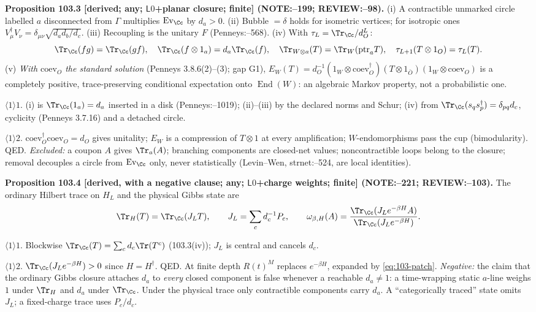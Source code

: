\textbf{Proposition 103.3 [derived; any; \(\mathsf L0\)+planar closure; finite] (NOTE:--199; REVIEW:--98).}
(i) A contractible unmarked circle labelled \(a\) disconnected from \(\Gamma\) multiplies \(\operatorname{Ev}_\Cc\) by \(d_a>0\).
(ii) Bubble \(=\delta\) holds for isometric vertices; for isotropic ones \(V^\dagger_\mu V_\nu=\delta_{\mu\nu}\sqrt{d_ad_b/d_c}\).
(iii) Recoupling is the unitary \(F\) (Penneys:--568). (iv) With \(\tau_L=\Tr_\Cc/d_O^L\):
\[
 \Tr_\Cc(fg)=\Tr_\Cc(gf),\quad \Tr_\Cc(f\otimes1_a)=d_a\Tr_\Cc(f),\quad \Tr_{W\otimes a}(T)=\Tr_W(\mathrm{ptr}_aT),\quad \tau_{L+1}(T\otimes1_O)=\tau_L(T).
\]
(v) \emph{With \(\mathrm{coev}_O\) the standard solution} (Penneys 3.8.6(2)--(3); gap G1),\newline
\(E_W(T)=d_O^{-1}(1_W\otimes\mathrm{coev}_O^\dagger)(T\otimes1_{\bar O})(1_W\otimes\mathrm{coev}_O)\) is a completely positive,
trace-preserving conditional expectation onto \(\operatorname{End}(W)\): an algebraic Markov property, not a probabilistic one.
\par\(\langle1\rangle1\). (i) is \(\Tr_\Cc(1_a)=d_a\) inserted in a disk (Penneys:--1019); (ii)--(iii) by the declared norms and
Schur; (iv) from \(\Tr_\Cc(s_qs_p^\dagger)=\delta_{pq}d_c\), cyclicity (Penneys 3.7.16) and a detached circle.
\par\(\langle1\rangle2\). \(\mathrm{coev}_O^\dagger\mathrm{coev}_O=d_O\) gives unitality; \(E_W\) is a compression of \(T\otimes1\) at every
amplification; \(W\)-endomorphisms pass the cup (bimodularity). QED.
\emph{Excluded:} a coupon \(A\) gives \(\Tr_a(A)\); branching components are closed-net values; noncontractible loops belong to the
closure; removal decouples a circle from \(\operatorname{Ev}_\Cc\) only, never statistically (Levin--Wen, strnet:--524, are local identities).

\textbf{Proposition 103.4 [derived, with a negative clause; any; \(\mathsf L0\)+charge weights; finite] (NOTE:--221; REVIEW:--103).}
The ordinary Hilbert trace on \(H_L\) and the physical Gibbs state are
\begin{equation}\label{eq:103-JL}
 \Tr_{H}(T)=\Tr_\Cc(J_LT),\qquad J_L=\sum_cd_c^{-1}P_c,\qquad
 \omega_{\beta,H}(A)=\frac{\Tr_\Cc(J_Le^{-\beta H}A)}{\Tr_\Cc(J_Le^{-\beta H})}.
\end{equation}
\par\(\langle1\rangle1\). Blockwise \(\Tr_\Cc(T)=\sum_cd_c\Tr(T^c)\) (103.3(iv)); \(J_L\) is central and cancels \(d_c\).
\par\(\langle1\rangle2\). \(\Tr_\Cc(J_Le^{-\beta H})>0\) since \(H=H^\dagger\). QED. At finite depth \(R(t)^M\) replaces \(e^{-\beta H}\), expanded by \eqref{eq:103-patch}.
\emph{Negative:} the claim that the ordinary Gibbs closure attaches \(d_a\) to \emph{every} closed component is false whenever a reachable
\(d_a\neq1\): a time-wrapping static \(a\)-line weighs \(1\) under \(\Tr_H\) and \(d_a\) under \(\Tr_\Cc\). Under the physical trace only
contractible components carry \(d_a\). A ``categorically traced'' state omits \(J_L\); a fixed-charge trace uses \(P_c/d_c\).

